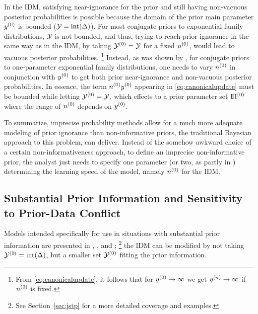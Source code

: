 In the IDM, satisfying near-ignorance for the prior and still having non-vacuous posterior probabilities is possible
because the domain of the prior main parameter $y^{(0)}$ is bounded ($\mathcal{Y} = \text{int}(\Delta)$).
For most conjugate priors to exponential family distributions, $\mathcal{Y}$ is not bounded,
and thus, trying to reach prior ignorance in the same way as in the IDM,
by taking $\mathcal{Y}^{(0)} = \mathcal{Y}$ for a fixed $n^{(0)}$, would lead to vacuous posterior probabilities.%
\footnote{From \eqref{eq:canonicalupdate}, it follows that for $y^{(0)} \rightarrow \infty$ we get $y^{(n)} \rightarrow \infty$ if $n^{(0)}$ is fixed.}
Instead, as was shown by \textcite{2012:benavolizaffalon}, for conjugate priors to one-parameter exponential family distributions,
one needs to vary $n^{(0)}$ in conjunction with $y^{(0)}$ to get both prior near-ignorance and non-vacuous posterior probabilities.
In essence, the term $n^{(0)} y^{(0)}$ appearing in \eqref{eq:canonicalupdate} must be bounded while letting $\mathcal{Y}^{(0)} = \mathcal{Y}$,
which effects to a prior parameter set $\text{I}\!\Pi^{(0)}$ where the range of $n^{(0)}$ depends on $y^{(0)}$.

To summarize, imprecise probability methods allow for a much more adequate modeling of prior ignorance
than non-informative priors, the traditional Bayesian approach to this problem, can deliver.
Instead of the somehow awkward choice of a certain non-informativeness approach,
to define an imprecise non-informative prior, the analyst just needs to specify one parameter
(or two, as partly in \textcite{2012:benavolizaffalon})
determining the learning speed of the model, namely $n^{(0)}$ for the IDM.


\subsection{Substantial Prior Information and Sensitivity to Prior-Data Conflict}
\label{sec:pdc-sensitivity}

Models intended specifically for use in situations with substantial prior information are presented in
\textcite[footnote no.~10 in \S 1.1.4, and \S 7.8.3]{1991:walley}, \textcite{2005:quaeghebeurcooman}, and \textcite{Walter2009a};%
\footnote{See Section~\ref{sec:jstp} for a more detailed coverage and examples.}
the IDM can be modified by not taking $\mathcal{Y}^{(0)} = \text{int}(\Delta)$, but a smaller set $\mathcal{Y}^{(0)}$ fitting the prior information.

